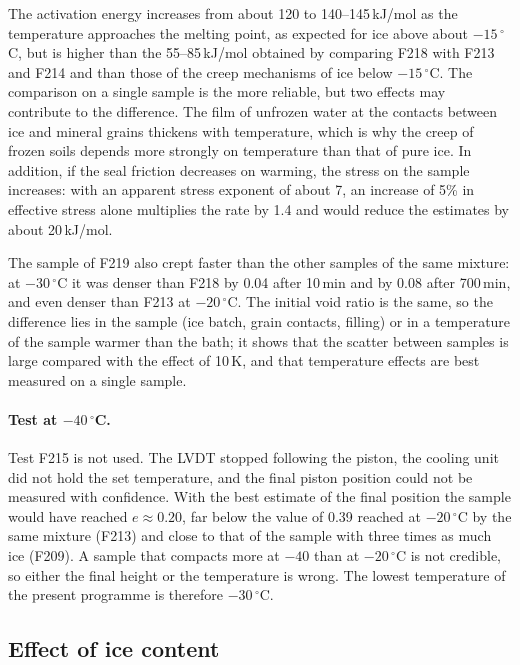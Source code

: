 The activation energy increases from about 120 to 140--145\,kJ/mol as the temperature approaches the melting point, as expected for ice above about $-15\,^\circ$C, but is higher than the 55--85\,kJ/mol obtained by comparing F218 with F213 and F214 and than those of the creep mechanisms of ice below $-15\,^\circ$C. The comparison on a single sample is the more reliable, but two effects may contribute to the difference. The film of unfrozen water at the contacts between ice and mineral grains thickens with temperature, which is why the creep of frozen soils depends more strongly on temperature than that of pure ice. In addition, if the seal friction decreases on warming, the stress on the sample increases: with an apparent stress exponent of about 7, an increase of 5\% in effective stress alone multiplies the rate by 1.4 and would reduce the estimates by about 20\,kJ/mol.

The sample of F219 also crept faster than the other samples of the same mixture: at $-30\,^\circ$C it was denser than F218 by 0.04 after 10\,min and by 0.08 after 700\,min, and even denser than F213 at $-20\,^\circ$C. The initial void ratio is the same, so the difference lies in the sample (ice batch, grain contacts, filling) or in a temperature of the sample warmer than the bath; it shows that the scatter between samples is large compared with the effect of 10\,K, and that temperature effects are best measured on a single sample.

\paragraph{Test at $-40\,^\circ$C.} Test F215 is not used. The LVDT stopped following the piston, the cooling unit did not hold the set temperature, and the final piston position could not be measured with confidence. With the best estimate of the final position the sample would have reached $e\approx0.20$, far below the value of 0.39 reached at $-20\,^\circ$C by the same mixture (F213) and close to that of the sample with three times as much ice (F209). A sample that compacts more at $-40$ than at $-20\,^\circ$C is not credible, so either the final height or the temperature is wrong. The lowest temperature of the present programme is therefore $-30\,^\circ$C.

\subsection{Effect of ice content}
\label{subsec:ice_content}

